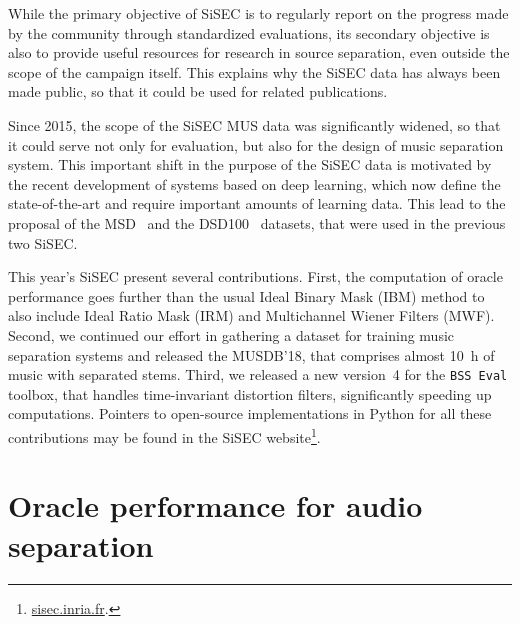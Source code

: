 \documentclass{llncs}
\begin{document}

While the primary objective of SiSEC is to regularly report on the progress made by the community through standardized evaluations, its secondary objective is also to provide useful resources for research in source separation, even outside the scope of the campaign itself. This explains why the SiSEC data has always been made public, so that it could be used for related publications. %

Since 2015, the scope of the SiSEC MUS data was significantly widened, so that it could serve not only for evaluation, but also for the design of music separation system. This important shift in the purpose of the SiSEC data is motivated by the recent development of systems based on deep learning, which now define the state-of-the-art and require important amounts of learning data. This lead to the proposal of the MSD~\cite{sisec2015} and the DSD100~\cite{sisec2016} datasets, that were used in the previous two SiSEC.

This year's SiSEC present several contributions. First, the computation of oracle performance goes further than the usual Ideal Binary Mask (IBM) method to also include Ideal Ratio Mask (IRM) and Multichannel Wiener Filters (MWF). Second, we continued our effort in gathering a dataset for training music separation systems and released the MUSDB'18, that comprises almost 10~h of music with separated stems. Third, we released a new version~4 for the \texttt{BSS~Eval} toolbox, that handles time-invariant distortion filters, significantly speeding up computations. Pointers to open-source implementations in Python for all these contributions may be found in the SiSEC website\footnote{\url{sisec.inria.fr}.}.

\section{Oracle performance for audio separation}
\label{sec:oracle}
\end{document}
